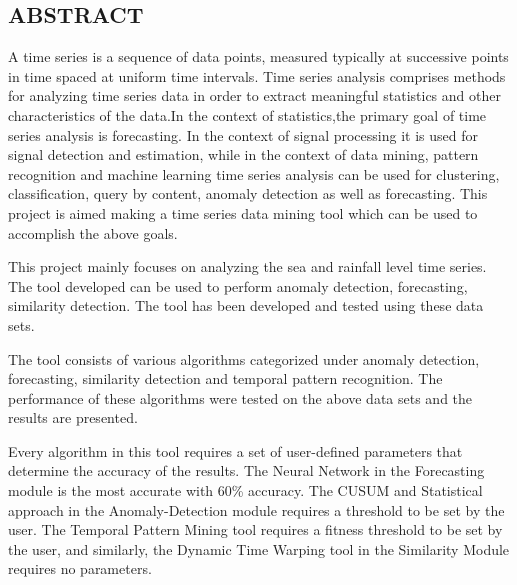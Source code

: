 \documentclass[12pt]{report}
\begin{document}
\newpage

\begin{center}
\section*{ABSTRACT}
\end{center} 
A time series is a sequence of data points, measured typically at successive points in time spaced at uniform time intervals. Time series analysis comprises methods for analyzing time series data in order to extract meaningful statistics and other characteristics of the data.In the context of statistics,the primary goal of time series analysis is forecasting. In the context of signal processing it is used for signal detection and estimation, while in the context of data mining, pattern recognition and machine learning time series analysis can be used for clustering, classification, query by content, anomaly detection as well as forecasting. This project is aimed making a time series data mining tool which can be used to accomplish the above goals. 



This project mainly focuses on analyzing the sea and rainfall level time series. 
The tool developed can be used to perform anomaly detection, forecasting, similarity detection. The tool has been developed and tested using these data sets.


The tool consists of various algorithms categorized under anomaly detection, forecasting, similarity detection and temporal pattern recognition. The performance of these algorithms were tested on the above data sets and the results are presented. 


Every algorithm in this tool requires a set of user-defined parameters that determine the accuracy of the results. The Neural Network in the Forecasting module is the most accurate with 60\% accuracy. The CUSUM and Statistical approach in the Anomaly-Detection module requires a threshold to be set by the user. The Temporal Pattern Mining tool requires a fitness threshold to be set by the user, and similarly, the Dynamic Time Warping tool in the Similarity Module requires no parameters.


\tableofcontents

\newpage
{}
\listoffigures
\end{document}
